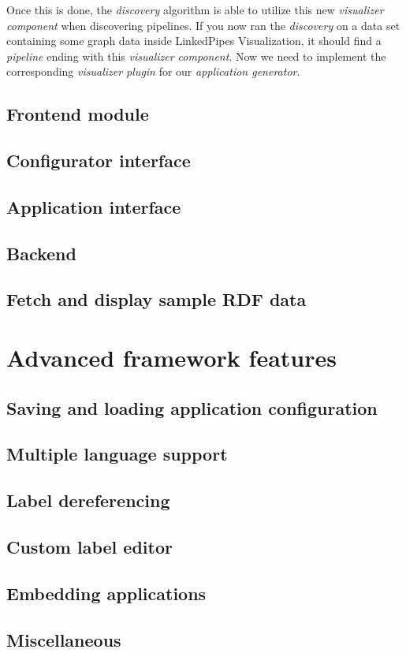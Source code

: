 Once this is done, the \emph{discovery} algorithm is able to utilize this new \emph{visualizer component} when discovering pipelines. If you now ran the \emph{discovery} on a data set containing some graph data inside LinkedPipes Visualization, it should find a \emph{pipeline} ending with this \emph{visualizer component}. Now we need to implement the corresponding \emph{visualizer plugin} for our \emph{application generator}.

\subsection{Frontend module}

\subsection{Configurator interface}

\subsection{Application interface}

\subsection{Backend}

\subsection{Fetch and display sample RDF data}



\section{Advanced framework features}

\subsection{Saving and loading application configuration}

\subsection{Multiple language support}

\subsection{Label dereferencing}

\subsection{Custom label editor}

\subsection{Embedding applications}

\subsection{Miscellaneous}
